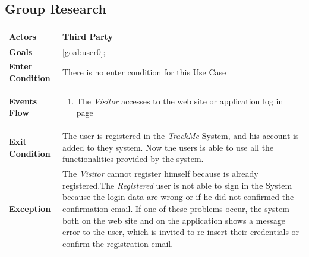   \subsection{Group Research}


\begin{table}[H]
	\centering
    
    \begin{tabular}{|p{3.5cm}|p{10.3cm}|}
    
    \hline
    \textbf{\large{Actors}}  			& \tabitem Third Party 																\\
    \hline
    \textbf{\large{Goals}} 				& \ref{goal:user0};\\
    
    \hline
    \textbf{\large{Enter Condition}}	& There is no enter condition for this Use Case		\\
    
    \hline
    \textbf{\large{Events Flow}}		& \begin{enumerate}[leftmargin=0.5cm]
                                          	\item The \emph{Visitor}  accesses to the web site or application log in page
                                           
                                          \end{enumerate}
    										\\
    \hline
    \textbf{\large{Exit Condition}} 	& The user is registered in the \emph{TrackMe} System, and his account is added to they system. Now the users is able to use all the functionalities provided by the system. \\
    
    \hline
    \textbf{\large{Exception}} 			& The \emph{Visitor} cannot register himself because is already registered.\newline The \emph{Registered} user                                         is not able to sign in the System because the login data are wrong or if he did not confirmed  the confirmation email. \newline
    										If one of these problems occur, the system both on the web site and on the application shows a message error to the user, which is invited to re-insert their credentials or confirm the registration email.\\
    
    \hline
    
    
    \end{tabular}
	
\end{table}
